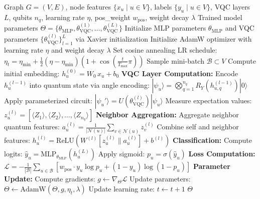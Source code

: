 \begin{algorithm}[H]
\caption{Quantum GNN Forward Pass and Training}
\label{alg:qgnn}
\begin{algorithmic}[1]
\REQUIRE Graph $G = (V, E)$, node features $\{x_u \mid u \in V\}$, labels $\{y_u \mid u \in V\}$, VQC layers $L$, qubits $n_q$, learning rate $\eta$, pos\_weight $w_{\text{pos}}$, weight decay $\lambda$
\ENSURE Trained model parameters $\Theta = \{\theta_{\text{MLP}}, \theta_{\text{VQC}}^{(1)}, \ldots, \theta_{\text{VQC}}^{(L)}\}$
\STATE Initialize MLP parameters $\theta_{\text{MLP}}$ and VQC parameters $\{\theta_{\text{VQC}}^{(l)}\}_{l=1}^{L}$ via Xavier initialization
\STATE Initialize AdamW optimizer with learning rate $\eta$ and weight decay $\lambda$
\STATE Set cosine annealing LR schedule: $\eta_t = \eta_{\min} + \frac{1}{2}(\eta - \eta_{\min})\left(1 + \cos\left(\frac{t}{T_{\max}}\pi\right)\right)$
    \STATE Sample mini-batch $\mathcal{B} \subset V$
        \STATE Compute initial embedding: $h_u^{(0)} = W_0 \, x_u + b_0$
    \ENDFOR
            \STATE \textbf{VQC Layer Computation:}
            \STATE \quad Encode $h_u^{(l-1)}$ into quantum state via angle encoding: $|\psi_u\rangle = \bigotimes_{q=1}^{n_q} R_Y(h_{u,q}^{(l-1)})|0\rangle$
            \STATE \quad Apply parameterized circuit: $|\psi_u'\rangle = U(\theta_{\text{VQC}}^{(l)})|\psi_u\rangle$
            \STATE \quad Measure expectation values: $z_u^{(l)} = \left[\langle Z_1 \rangle, \langle Z_2 \rangle, \ldots, \langle Z_{n_q} \rangle\right]$
        \ENDFOR
            \STATE \textbf{Neighbor Aggregation:}
            \STATE \quad Aggregate neighbor quantum features: $a_u^{(l)} = \frac{1}{|\mathcal{N}(u)|} \sum_{v \in \mathcal{N}(u)} z_v^{(l)}$
            \STATE \quad Combine self and neighbor features: $h_u^{(l)} = \text{ReLU}\!\left(W^{(l)} \left[z_u^{(l)} \| a_u^{(l)}\right] + b^{(l)}\right)$
        \ENDFOR
    \ENDFOR
    \STATE \textbf{Classification:}
        \STATE Compute logits: $\hat{y}_u = \text{MLP}_{\theta_{\text{MLP}}}(h_u^{(L)})$
        \STATE Apply sigmoid: $p_u = \sigma(\hat{y}_u)$
    \ENDFOR
    \STATE \textbf{Loss Computation:}
    \STATE $\mathcal{L} = -\frac{1}{|\mathcal{B}|} \sum_{u \in \mathcal{B}} \left[w_{\text{pos}} \cdot y_u \log p_u + (1 - y_u) \log(1 - p_u)\right]$
    \STATE \textbf{Parameter Update:}
    \STATE Compute gradients: $g \leftarrow \nabla_\Theta \mathcal{L}$
    \STATE Update parameters: $\Theta \leftarrow \text{AdamW}(\Theta, g, \eta_t, \lambda)$
    \STATE Update learning rate: $t \leftarrow t + 1$
\ENDFOR
\RETURN $\Theta$
\end{algorithmic}
\end{algorithm}


